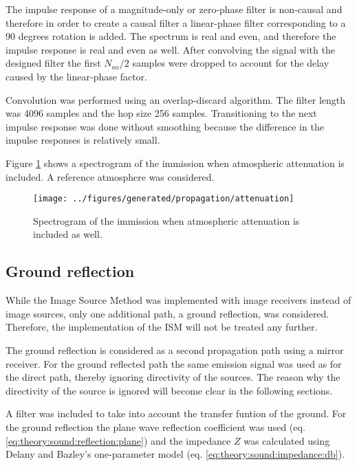 The impulse response of a magnitude-only or zero-phase filter is non-causal and therefore in
order to create a causal filter a linear-phase filter corresponding to a 90
degrees rotation is added. The spectrum is real and even, and therefore the impulse
response is real and even as well. After convolving the signal with the designed
filter the first $N_{aa}/2$ samples were dropped to account for the delay caused
by the linear-phase factor.

Convolution was performed using an overlap-discard algorithm. The filter length was
4096 samples and the hop size 256 samples. Transitioning to the next impulse
response was done without smoothing because the difference in the impulse responses is relatively small.

Figure \ref{fig:implementation:propagation:attenuation} shows a spectrogram of
the immission when atmospheric attenuation is included. A reference atmosphere
was considered.

\begin{figure}[H]
  \centering
  \texttt{[image: ../figures/generated/propagation/attenuation]}
  \caption{Spectrogram of the immission when atmospheric attenuation is included as well.}
  \label{fig:implementation:propagation:attenuation}
\end{figure}

\newpage
\subsection{Ground reflection} %
While the Image Source Method was implemented with image
receivers instead of image sources, only one additional path,
a ground reflection, was considered. Therefore, the implementation of the ISM
will not be treated any further.

The ground reflection is considered as a second propagation path using a mirror receiver.
For the ground reflected path the same emission signal was used as for the
direct path, thereby ignoring directivity of the sources. The reason why the directivity of
the source is ignored will become clear in the following sections.

A filter was included to take into account the transfer funtion of the ground.
For the ground reflection the plane wave reflection coefficient was used (eq. \eqref{eq:theory:sound:reflection:plane}) and the impedance $Z$ was
calculated using Delany and Bazley's one-parameter model (eq. \eqref{eq:theory:sound:impedance:db}).

